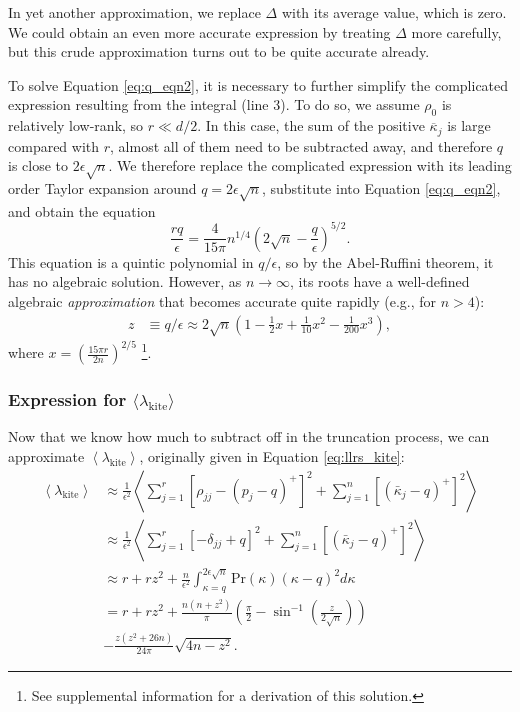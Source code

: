 \documentclass[aps,pra, twocolumn]{revtex4-1}
\newcommand{\expect}[1]{\ensuremath{\left\langle#1\right\rangle}}
\begin{document}
In yet another approximation, we replace $\Delta$ with its average value, which is zero.  We could obtain an even more accurate expression 
 by treating $\Delta$ more carefully, but this crude approximation turns out to be quite accurate already.

To solve Equation \eqref{eq:q_eqn2}, it is necessary to further simplify the complicated expression resulting from the integral (line 3).  To do so, we 
assume  $\rho_0$ is relatively low-rank, so $r \ll d/2$.  In this case, the sum of the positive $\overline{\kappa}_j$ is large compared 
with $r$, almost all of them need to be subtracted away, and therefore $q$ is close to $2\epsilon\sqrt{n}$.  We therefore replace 
the complicated expression with its leading order Taylor expansion around $q=2\epsilon\sqrt{n}$, substitute into Equation \eqref{eq:q_eqn2}, and 
obtain the equation
\begin{equation}
\frac{rq}{\epsilon}  = \frac{4}{15\pi}n^{1/4}\left(2\sqrt{n}-\frac{q}{\epsilon}\right)^{5/2}.
\end{equation}
This equation is a quintic polynomial in $q/\epsilon$, so by the Abel-Ruffini theorem, it has no algebraic solution.  However, as $n \rightarrow \infty$, its roots have a well-defined algebraic \emph{approximation} that becomes accurate quite rapidly (e.g., for $n>4$):
\begin{align}
\label{eq:truncation}
z &\equiv q/\epsilon \approx 2\sqrt{n}\left(1 -\frac{1}{2}x +\frac{1}{10}x^{2} - \frac{1}{200}x^{3}\right),
\end{align}
where $x = \left(\frac{15 \pi r}{2n}\right)^{2/5}$ \footnote{See supplemental information for a derivation of this solution.}.

\subsubsection{Expression for $\langle \lambda_{\mathrm{kite}}\rangle$}
Now that we know how much to subtract off in the truncation process, we can approximate $\expect{\lambda_{\mathrm{kite}}}$, originally given in Equation \eqref{eq:llrs_kite}:
\begin{align}
\nonumber \expect{\lambda_{\mathrm{kite}}} &\approx  \frac{1}{\epsilon^{2}}\left\langle\sum_{j=1}^{r}[\rho_{jj}- (p_j-q)^{+}]^2 + \sum_{j=1}^{n}\left[(\bar{\kappa}_j-q)^+\right]^2 \right\rangle\\
\nonumber &\approx \frac{1}{\epsilon^{2}} \left\langle\sum_{j=1}^{r}[-\delta_{jj} +  q ]^2 + \sum_{j=1}^{n}\left[(\bar{\kappa}_j-q)^+\right]^2 \right\rangle\\
\nonumber  &\approx r + rz^2 + \frac{n}{\epsilon^{2}}\int_{\kappa=q}^{2\epsilon\sqrt{n}}{ \mathrm{Pr}(\kappa)(\kappa-q)^2 d\kappa} \\
\nonumber &=r + rz^{2} + \frac{n(n+z^{2})}{\pi}\left(\frac{\pi}{2} - \sin^{-1}\left(\frac{z}{2\sqrt{n}}\right)\right) \\
& - \frac{z(z^{2}+26n)}{24\pi}\sqrt{4n-z^{2}}.
\end{align}
\end{document}
